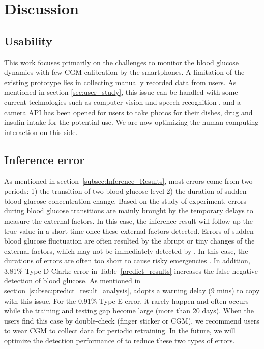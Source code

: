 \section{Discussion}
\label{sec:discussion}
\subsection{Usability}
\textcolor[rgb]{1.00,0.00,0.00}{This work focuses primarily on the challenges to monitor the blood glucose dynamics with few CGM calibration by the smartphones. A limitation of the existing prototype lies in collecting manually recorded data from users. As mentioned in section \ref{sec:user_study}, this issue can be handled with some current technologies such as computer vision \cite{bib:kawano2015foodcam}  and speech recognition \cite{bib:hinton2012deep}, and a camera API has been opened for users to take photos for their dishes, drug and insulin intake for the potential use. We are now optimizing the human-computing interaction on this side.}

\subsection{Inference error}
\textcolor[rgb]{1.00,0.00,0.00}{As mentioned in section~\ref{subsec:Inference_Results}, most errors come from two periods: 1) the transition of two blood glucose level 2) the duration of sudden blood glucose concentration change.
Based on the study of experiment, errors during blood glucose transitions are mainly brought by the temporary delays to measure the external factors. In this case, the inference result will follow up the true value in a short time once these external factors detected. Errors of sudden blood glucose fluctuation are often resulted by the abrupt or tiny changes of the external factors,
which may not be immediately detected by \sysname. In this case, the durations of errors are often too short to cause risky emergencies \cite{bib:Low_Blood_Glucose_(Hypoglycemia),bib:whitmer2009hypoglycemic}. In addition, 3.81\% Type D Clarke error in Table~\ref{predict_results} increases the false negative detection of blood glucose.
As mentioned in section~\ref{subsec:predict_result_analysis}, \sysname adopts a warning delay (9 mins) to copy with this issue. For the 0.91\% Type E error, it rarely happen and often occurs while the training and testing gap become large (more than 20 days). When the users find this case by double-check (finger sticker or CGM), we recommend users to wear CGM to collect data for periodic retraining. In the future, we will optimize the detection performance of \sysname to reduce these two types of errors.}


